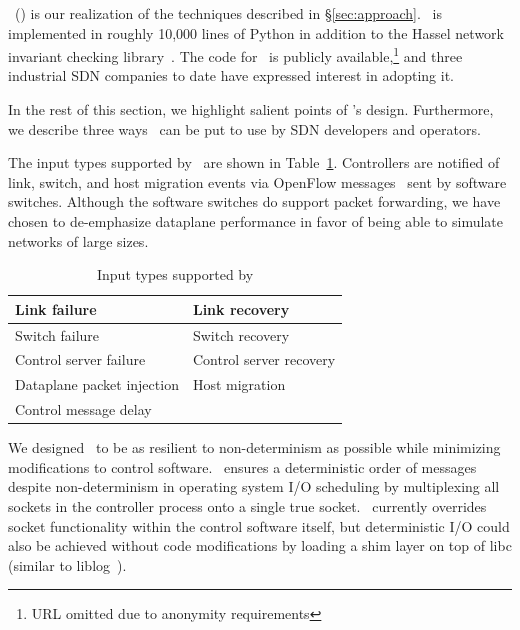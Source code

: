 \projectname~(\projectmeaning) is our realization of the techniques described in
\S\ref{sec:approach}. \projectname~is implemented in roughly 10,000 lines of Python in
addition to the Hassel network invariant checking library~\cite{hsa}. The code
for \projectname~is publicly available,\footnote{URL omitted due to anonymity requirements}
and three industrial SDN companies to date have expressed interest in adopting it.

In the rest of this section, we highlight salient points of \projectname's
design. Furthermore, we describe three ways \projectname~can be put to use
by SDN developers and operators.

The input types supported by \projectname~are shown in Table~\ref{tab:inputs}.
Controllers are notified of link, switch, and host migration events
via OpenFlow messages~\cite{openflow} sent by software switches.
Although the software switches do support packet forwarding, we
have chosen to de-emphasize dataplane performance in favor of
being able to simulate networks of large sizes. %

\begin{table}
\centering
\begin{tabular}{|l|l|}
\hline
Link failure & Link recovery \\
\hline
Switch failure & Switch recovery \\
\hline
Control server failure & Control server recovery \\
\hline
Dataplane packet injection & Host migration \\
\hline
Control message delay & \\
\hline
\end{tabular}
\caption{Input types supported by \projectname}
\label{tab:inputs}
\end{table}

We designed \projectname~to be as resilient to non-determinism as possible
while minimizing modifications to control software.
\projectname~ensures a deterministic order of messages despite
non-determinism in operating system I/O scheduling
by multiplexing all sockets in the controller process
onto a single true socket. \projectname~currently
overrides socket functionality within the control software itself, but
deterministic I/O could also be achieved without code modifications by
loading a shim layer on top of
libc (similar to liblog~\cite{Geels:2006:RDD:1267359.1267386}).

